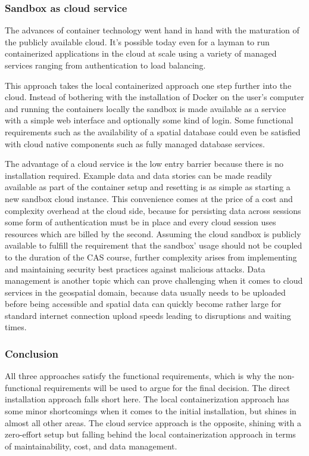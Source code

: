 \documentclass[11pt, a4paper, oneside, parskip=full-]{scrartcl}
\begin{document}
\subsubsection*{Sandbox as cloud service}
The advances of container technology went hand in hand with the maturation of
the publicly available cloud. It's possible today even for a layman to run
containerized applications in the cloud at scale using a variety of managed
services ranging from authentication to load balancing.

This approach takes the local containerized approach one step further into the
cloud. Instead of bothering with the installation of Docker on the user's
computer and running the containers locally the sandbox is made available as a
service with a simple web interface and optionally some kind of login. Some
functional requirements such as the availability of a spatial database could
even be satisfied with cloud native components such as fully managed database
services.

The advantage of a cloud service is the low entry barrier because there is no
installation required. Example data and data stories can be made readily
available as part of the container setup and resetting is as simple as starting
a new sandbox cloud instance. This convenience comes at the price of a cost and
complexity overhead at the cloud side, because for persisting data across
sessions some form of authentication must be in place and every cloud session
uses resources which are billed by the second. Assuming the cloud sandbox is
publicly available to fulfill the requirement that the sandbox' usage should not
be coupled to the duration of the CAS course, further complexity arises from
implementing and maintaining security best practices against malicious attacks.
Data management is another topic which can prove challenging when it comes to
cloud services in the geospatial domain, because data usually needs to be
uploaded before being accessible and spatial data can quickly become rather
large for standard internet connection upload speeds leading to disruptions and
waiting times.

\subsubsection*{Conclusion}
All three approaches satisfy the functional requirements, which is why the
non-functional requirements will be used to argue for the final decision. The
direct installation approach falls short here. The local containerization
approach has some minor shortcomings when it comes to the initial installation,
but shines in almost all other areas. The cloud service approach is the
opposite, shining with a zero-effort setup but falling behind the local
containerization approach in terms of maintainability, cost, and data
management.
\end{document}
